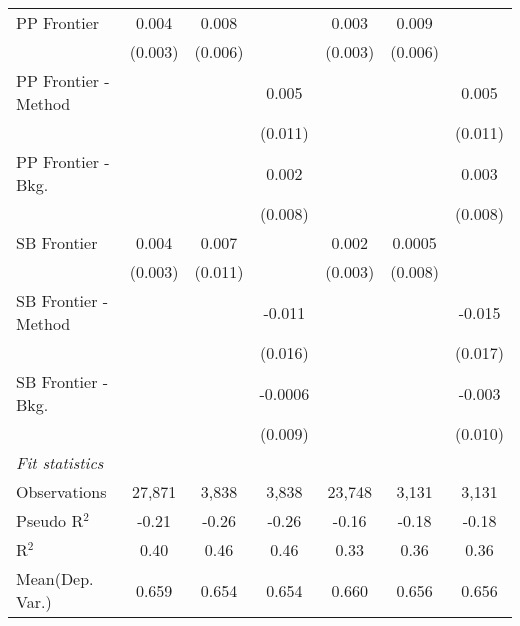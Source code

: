 \begin{tabular}{lcccccc}
   PP Frontier          & 0.004        & 0.008       &                & 0.003          & 0.009        &   \\   
                        & (0.003)      & (0.006)     &                & (0.003)        & (0.006)      &   \\   
   PP Frontier - Method &              &             & 0.005          &                &              & 0.005\\   
                        &              &             & (0.011)        &                &              & (0.011)\\   
   PP Frontier - Bkg.   &              &             & 0.002          &                &              & 0.003\\   
                        &              &             & (0.008)        &                &              & (0.008)\\   
   SB Frontier          & 0.004        & 0.007       &                & 0.002          & 0.0005       &   \\   
                        & (0.003)      & (0.011)     &                & (0.003)        & (0.008)      &   \\   
   SB Frontier - Method &              &             & -0.011         &                &              & -0.015\\   
                        &              &             & (0.016)        &                &              & (0.017)\\   
   SB Frontier - Bkg.   &              &             & -0.0006        &                &              & -0.003\\   
                        &              &             & (0.009)        &                &              & (0.010)\\   
   \midrule
   \emph{Fit statistics}\\
   Observations         & 27,871       & 3,838       & 3,838          & 23,748         & 3,131        & 3,131\\  
   Pseudo R$^2$         & -0.21        & -0.26       & -0.26          & -0.16          & -0.18        & -0.18\\  
   R$^2$                & 0.40         & 0.46        & 0.46           & 0.33           & 0.36         & 0.36\\  
Mean(Dep. Var.) & 0.659 & 0.654 & 0.654 & 0.660 & 0.656 & 0.656 \\
   

\end{tabular}
